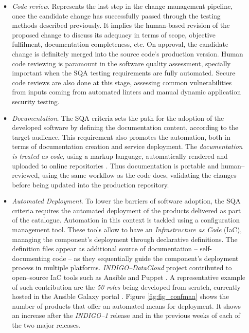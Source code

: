 \documentclass[journal]{IEEEtran}
\begin{document}
\begin{itemize}
\item \textit{Code review}.
Represents the last step in the change management pipeline, once the candidate change has
successfully passed through the testing methods described previously. It implies the human-based
revision of the proposed change to discuss its adequacy in terms of scope, objective fulfilment,
documentation completeness, etc. On approval, the candidate change is definitely merged into
the source code's production version. Human code reviewing is paramount in the software quality assessment, specially
important when the SQA testing requirements are fully automated. Secure code reviews are also 
done at this stage, assessing common vulnerabilities from inputs coming from automated linters
and manual dynamic application security testing.

\item \textit{Documentation}.
The SQA criteria sets the path for the adoption of the developed software by
defining the documentation content, according to the target audience. This requirement also
promotes the automation, both in terms of documentation creation and service deployment. The
\textit{documentation is treated as code}, using a markup language, automatically rendered and
uploaded to online repositories \cite{indigo-gitbook}. Thus documentation is portable and
human--reviewed, using the same workflow as the code does, validating the changes before being
updated into the production repository.

\item \textit{Automated Deployment}.
To lower the barriers of software adoption, the SQA criteria requires the automated
deployment of the products delivered as part of the catalogue. Automation in this context is
tackled using a configuration management tool. These tools allow to have an
\textit{Infrastructure as Code} (IaC), managing the component's deployment through declarative
definitions. The definition files appear as additional source of documentation
-- self-documenting code -- as they sequentially guide the component's deployment process in multiple
platforms. {\sl INDIGO--DataCloud} project contributed to open--source IaC tools such
as Ansible \cite{indigo-ansible} and Puppet \cite{indigo-puppet}. A representative example of
such contribution are the \textit{50 roles} being developed from scratch, currently hosted in
the Ansible Galaxy portal \cite{indigo-galaxy}. Figure
\ref{fig:fig_confman} shows the number of products that offer an automated means for deployment.
It shows an increase after the {\sl INDIGO--1} release and in the previous weeks of each
of the two major releases.
\end{itemize}
\end{document}
